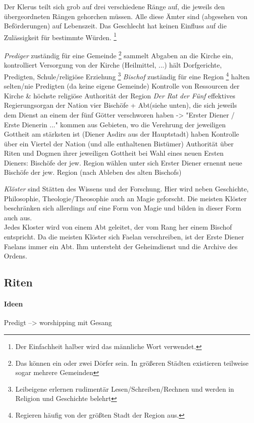 Der Klerus teilt sich grob auf drei verschiedene Ränge auf, die jeweils den übergeordneten Rängen gehorchen müssen. 
Alle diese Ämter sind (abgesehen von Beförderungen) auf Lebenszeit.
Das Geschlecht hat keinen Einfluss auf die Zulässigkeit für bestimmte Würden.
\footnote{Der Einfachheit halber wird das männliche Wort verwendet.}
\begin{outline}
	\1 \emph{Prediger}
		\2 zuständig für eine Gemeinde
		\footnote{Das können ein oder zwei Dörfer sein. In größeren Städten existieren teilweise sogar mehrere Gemeinden}
		\2 sammelt Abgaben an die Kirche ein, kontrolliert Versorgung von der Kirche (Heilmittel, ...)
		\2 hält Dorfgerichte, Predigten, Schule/religiöse Erziehung
		\footnote{Leibeigene erlernen rudimentär Lesen/Schreiben/Rechnen und werden in Religion und Geschichte belehrt}
	\1 \emph{Bischof}
		\2 zuständig für eine Region
		\footnote{Regieren häufig von der größten Stadt der Region aus.}
		\2 halten selten/nie Predigten (da keine eigene Gemeinde)
		\2 Kontrolle von Ressourcen der Kirche \& höchste religiöse Authorität der Region
	\1 \emph{Der Rat der Fünf}
		\2 effektives Regierungsorgan der Nation 
		\2 vier Bischöfe + Abt(siehe unten), die sich jeweils dem Dienst an einem der fünf Götter verschworen haben -> "Erster Diener / Erste Dienerin ..."
		\2 kommen aus Gebieten, wo die Verehrung der jeweiligen Gottheit am stärksten ist (Diener Asdirs aus der Hauptstadt)
		\2 haben Kontrolle über ein Viertel der Nation (und alle enthaltenen Bistümer)
		\2 Authorität über Riten und Dogmen ihrer jeweiligen Gottheit
		\2 bei Wahl eines neuen Ersten Dieners: Bischöfe der jew. Region wählen unter sich
		\2 Erster Diener ernennt neue Bischöfe der jew. Region (nach Ableben des alten Bischofs)
\end{outline}
\emph{Klöster} sind Stätten des Wissens und der Forschung. Hier wird neben Geschichte, Philosophie, Theologie/Theosophie auch an Magie geforscht. 
Die meisten Klöster beschränken sich allerdings auf eine Form von Magie und bilden in dieser Form auch aus.\\
Jedes Kloster wird von einem Abt geleitet, der vom Rang her einem Bischof entspricht. 
Da die meisten Klöster sich Faelan verschreiben, ist der Erste Diener Faelans immer ein Abt. 
Ihm untersteht der Geheimdienst und die Archive des Ordens.

\subsection{Riten}
\paragraph{Ideen}
\begin{outline}
	\1 Predigt --> worshipping mit Gesang
\end{outline}




